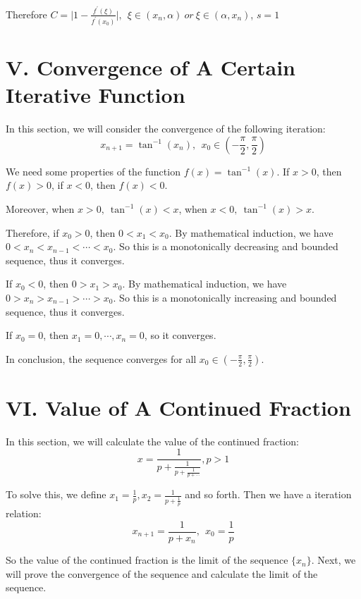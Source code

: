 \documentclass[a4paper]{article}
\begin{document}
Therefore $C = \vert 1-\frac{f^\prime(\xi)}{f^\prime(x_0)} \vert, ~~\xi \in (x_n, \alpha) ~or~ \xi \in (\alpha, x_n)$, $s = 1$

\section*{V. Convergence of A Certain Iterative Function}

In this section, we will consider the convergence of the following iteration:
\begin{equation}
  x_{n+1} = \tan^{-1} (x_n), ~~x_0 \in (-\frac{\pi}{2}, \frac{\pi}{2}) 
\end{equation}

We need some properties of the function $f(x) = \tan^{-1}(x)$. If $x>0$, then $f(x) > 0$, if $x<0$, then $f(x) < 0$. 

Moreover, when $x>0,~\tan^{-1}(x) < x$, when $x<0,~\tan^{-1}(x) > x$.

Therefore, if $x_0 > 0$, then $0< x_1 < x_0$. By mathematical induction, we have $0 < x_n < x_{n-1} < \cdots < x_0$. So this is a monotonically decreasing and bounded sequence, thus it converges.

If $x_0 < 0$, then $0 > x_1 > x_0$. By mathematical induction, we have $0 > x_n > x_{n-1} > \cdots > x_0$. So this is a monotonically increasing and bounded sequence, thus it converges.

If $x_0 = 0$, then $x_1 = 0, \cdots, x_n = 0$, so it converges.

In conclusion, the sequence converges for all $x_0 \in (-\frac{\pi}{2}, \frac{\pi}{2})$.

\section*{VI. Value of A Continued Fraction}

In this section, we will calculate the value of the continued fraction:
\begin{equation}
  x = \frac{1}{p + \frac{1}{p + \frac{1}{p + \cdots}}}, p>1
\end{equation}

To solve this, we define $x_1 = \frac{1}{p}, x_2 = \frac{1}{p+\frac{1}{p}}$ and so forth. Then we have a iteration relation:
\begin{equation}
  x_{n+1} = \frac{1}{p + x_n}, ~~x_0 = \frac{1}{p}
\end{equation}

So the value of the continued fraction is the limit of the sequence $\{x_n\}$. Next, we will prove the convergence of the sequence and calculate the limit of the sequence.
\end{document}
